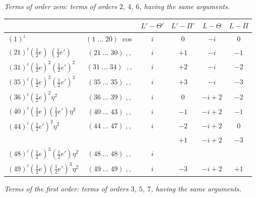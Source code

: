 \documentclass[11pt]{article}
\begin{document}
\textit{Terms of order zero: terms of orders $2$, $4$, $6$, having the same arguments.}

\smallskip

\begin{center}
\begin{tabular}{|l|c|c|c|c|c|}
\hline
 & & $L'-\Theta'$ & $L'-\Pi'$ & $L-\Theta$ & $L-\Pi$ \\
\hline
$(1)^i$ & $(1\;\ldots\;20)\;\cos$ & $i$ & $0$ & $-i$ & $0$ \\
$(21)^i(\tfrac{1}{2}e)\;(\tfrac{1}{2}e')$ & $(21\;\ldots\;30)\;,,$ & $i$ & $+1$ & $-i$ & $-1$ \\
$(31)^i(\tfrac{1}{2}e)^2(\tfrac{1}{2}e')^2$ & $(31\;\ldots\;34)\;\;,,$ & $i$ & $+2$ & $-i$ & $-2$ \\
$(35)^i(\tfrac{1}{2}e)^3(\tfrac{1}{2}e')^3$ & $(35\;\ldots\;35)\;,,$ & $i$ & $+3$ & $-i$ & $-3$ \\
$(36)^i(\tfrac{1}{2}e)^2\eta^2$ & $(36\;\ldots\;39)\;,,$ & $i$ & $0$ & $-i+2$ & $-2$ \\
$(40)^i(\tfrac{1}{2}e)(\tfrac{1}{2}e')\eta^2$ & $(40\;\ldots\;43)\;,,$ & $i$ & $-1$ & $-i+2$ & $-1$ \\
$(44)^i(\tfrac{1}{2}e')^2\eta^2$ & $(44\;\ldots\;47)\;,,$ & $i$ & $-2$ & $-i+2$ & $0$ \\
 & & & $+1$ & $-i+2$ & $-3$ \\
$(48)^i(\tfrac{1}{2}e)^3(\tfrac{1}{2}e')\eta^2$ & $(48\;\ldots\;48)\;,,$ & $i$ & & & \\
$(49)^i(\tfrac{1}{2}e)(\tfrac{1}{2}e')^3\eta^2$ & $(49\;\ldots\;49)\;,,$ & $i$ & $-3$ & $-i+2$ & $+1$ \\
\hline
\end{tabular}
\end{center}

\medskip

\textit{Terms of the first order: terms of orders $3$, $5$, $7$, having the same arguments.}

\smallskip
\end{document}
